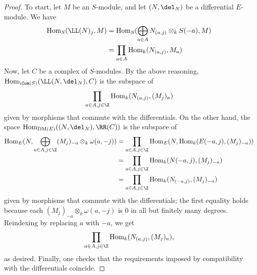 \documentclass[12pt]{amsart}
\theoremstyle{definition}
\theoremstyle{remark}
\newcommand{\Hom}{\operatorname{Hom}} %
\def\DM{\operatorname{DM}}
\def\o{\omega}
\begin{document}
\begin{proof}
To start, let $M$ be an $S$-module, and let $(N, \del_N)$ be a differential $E$-module. We have
\begin{align*}
\Hom_S( \LL(N)_j, M) &= \Hom_S(\bigoplus_{a \in A} N_{(a, j)} \otimes_k S(-a), M) \\
&=  \prod_{a \in A} \Hom_k ( N_{(a, j)} , M_a)\\
\end{align*}
Now, let $C$ be a complex of $S$-modules. By the above reasoning, $\Hom_{\Com(S)}( \LL(N, \del_N), C)$ is the subspace of 
$$
\prod_{a \in A, j \in \Z} \Hom_k ( N_{(a, j)} , (M_j)_{a})
$$
given by morphisms that commute with the differentials. On the other hand, the space $\Hom_{\DM(E)}((N, \del_N), \RR(C))$ is the subspace of 
\begin{align*}
\Hom_E(N, \bigoplus_{a \in A, j \in \Z} (M_j)_{-a} \otimes_k \o(a, -j)) &= \prod_{a \in A, j \in \Z}\Hom_E(N,  \Hom_k(E(-a, j), (M_j)_{-a}  ))  \\
&=   \prod_{a \in A, j \in \Z} \Hom_k(N(-a, j),  (M_j)_{-a} ) \\
&=  \prod_{a \in A, j \in \Z} \Hom_k(N_{(-a, j)},   (M_j)_{-a} )
\end{align*}
given by morphisms that commute with the differentials; the first equality holds because each $(M_j)_{-a} \otimes_k \o(a, -j)$ is 0 in all but finitely many degrees. Reindexing by replacing $a$ with $-a$, we get
$$
\prod_{a \in A, j \in \Z} \Hom_k(N_{(a, j)},   (M_j)_{a} ),
$$
as desired. Finally, one checks that the requirements imposed by compatibility with the differentials coincide.\end{proof}
\end{document}

